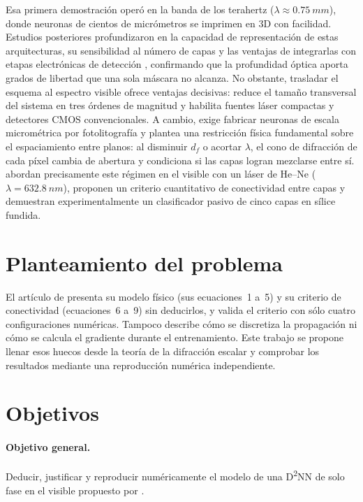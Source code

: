 Esa primera demostración operó en la banda de los terahertz ($\lambda\approx\SI{0.75}{mm}$),
donde neuronas de cientos de micrómetros se imprimen en 3D con facilidad. Estudios posteriores
profundizaron en la capacidad de representación de estas arquitecturas, su sensibilidad al
número de capas y las ventajas de integrarlas con etapas electrónicas de detección
\parencite{mengu2020}, confirmando que la profundidad óptica aporta grados de libertad que una
sola máscara no alcanza. No obstante, trasladar el esquema al espectro visible ofrece ventajas
decisivas: reduce el tamaño transversal del sistema en tres órdenes de magnitud y habilita
fuentes láser compactas y detectores CMOS convencionales. A cambio, exige fabricar neuronas de
escala micrométrica por fotolitografía y plantea una restricción física fundamental sobre el
espaciamiento entre planos: al disminuir $d_f$ o acortar $\lambda$, el cono de difracción de
cada píxel cambia de abertura y condiciona si las capas logran mezclarse entre sí.
\textcite{chen2021} abordan precisamente este régimen en el visible con un láser de He--Ne
($\lambda=\SI{632.8}{nm}$), proponen un criterio cuantitativo de conectividad entre capas y
demuestran experimentalmente un clasificador pasivo de cinco capas en sílice fundida.

\section{Planteamiento del problema}

El artículo de \textcite{chen2021} presenta su modelo físico (sus ecuaciones~1 a~5) y su
criterio de conectividad (ecuaciones~6 a~9) sin deducirlos, y valida el criterio con sólo
cuatro configuraciones numéricas. Tampoco describe cómo se discretiza la propagación ni
cómo se calcula el gradiente durante el entrenamiento. Este trabajo se propone llenar esos
huecos desde la teoría de la difracción escalar y comprobar los resultados mediante una
reproducción numérica independiente.

\section{Objetivos}

\paragraph{Objetivo general.} Deducir, justificar y reproducir numéricamente el modelo de
una D\textsuperscript{2}NN de solo fase en el visible propuesto por \textcite{chen2021}.

